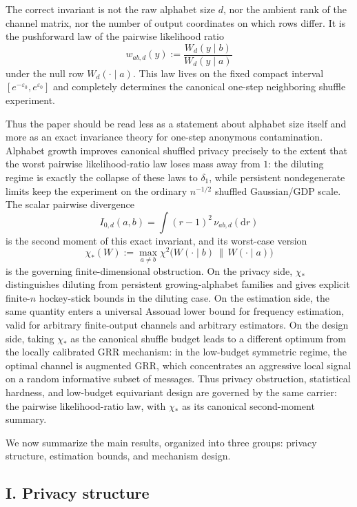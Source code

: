 \documentclass[11pt]{amsart}
\numberwithin{equation}{section}
\theoremstyle{definition}
\begin{document}
The correct invariant is not the raw alphabet size $d$, nor the ambient rank of the channel matrix, nor the
number of output coordinates on which rows differ.  It is the pushforward law of the pairwise likelihood ratio
\[
w_{ab,d}(y):=\frac{W_d(y\mid b)}{W_d(y\mid a)}
\]
under the null row $W_d(\cdot\mid a)$.  This law lives on the fixed compact interval
$[e^{-\varepsilon_0},e^{\varepsilon_0}]$ and completely determines the canonical one-step neighboring
shuffle experiment.

Thus the paper should be read less as a statement about alphabet size itself and more as an exact
invariance theory for one-step anonymous contamination.  Alphabet growth improves canonical shuffled
privacy precisely to the extent that the worst pairwise likelihood-ratio law loses mass away from $1$:
the diluting regime is exactly the collapse of these laws to $\delta_1$, while persistent
nondegenerate limits keep the experiment on the ordinary $n^{-1/2}$ shuffled Gaussian/GDP scale.
The scalar pairwise divergence
\[
I_{0,d}(a,b)=\int (r-1)^2\,\nu_{ab,d}(\mathrm dr)
\]
is the second moment of this exact invariant, and its worst-case version
\[
\chi_\ast(W):=\max_{a\neq b}\chi^2\!\bigl(W(\cdot\mid b)\,\|\,W(\cdot\mid a)\bigr)
\]
is the governing finite-dimensional obstruction.  On the privacy side, $\chi_\ast$ distinguishes
diluting from persistent growing-alphabet families and gives explicit finite-$n$ hockey-stick
bounds in the diluting case.  On the estimation side, the same quantity enters a universal
Assouad lower bound for frequency estimation, valid for arbitrary finite-output channels and
arbitrary estimators.  On the design side, taking $\chi_\ast$ as the canonical shuffle budget
leads to a different optimum from the locally calibrated GRR mechanism: in the low-budget symmetric
regime, the optimal channel is augmented GRR, which concentrates an aggressive local signal on a
random informative subset of messages.  Thus privacy obstruction, statistical hardness, and
low-budget equivariant design are governed by the same carrier: the pairwise likelihood-ratio
law, with $\chi_\ast$ as its canonical second-moment summary.

We now summarize the main results, organized into three groups: privacy structure, estimation bounds, and mechanism design.

\subsection*{I. Privacy structure}
\end{document}
